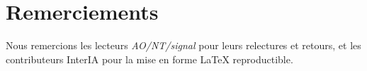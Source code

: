 \section*{Remerciements}
Nous remercions les lecteurs \textit{AO/NT/signal} pour leurs relectures et retours,
et les contributeurs InterIA pour la mise en forme LaTeX reproductible.
